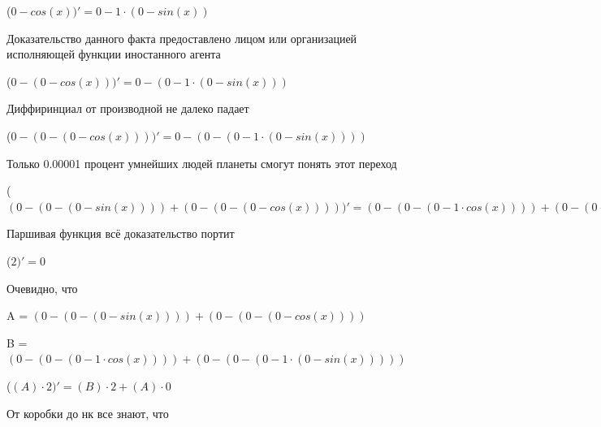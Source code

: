 \documentclass[12pt,a4paper,fleqn]{article}
\begin{document}
\begin{center}
\begin{center}
\begin{center}
\begin{center}
\begin{center}
\begin{center}
\begin{center}
\begin{center}
\begin{center}
\begin{center}
\begin{center}
\begin{center}
\begin{center}
\begin{center}
\begin{center}
\begin{center}
\begin{center}
\begin{center}
\begin{center}
\begin{center}
\begin{center}
\begin{center}
\begin{center}
\begin{center}
\begin{center}
\begin{center}
\begin{center}
\begin{center}
\begin{center}
\begin{center}
\begin{center}
\begin{center}
\begin{center}
\begin{center}
\begin{center}
\begin{center}
\begin{center}
\begin{center}
\begin{center}
\begin{center}
\begin{center}
\begin{center}
\begin{center}
\begin{center}
\begin{center}
\begin{center}
\begin{center}
\begin{center}
\begin{center}
\begin{center}
\begin{center}
\begin{center}
\begin{center}
\begin{center}
\begin{center}
\begin{center}
 ($0-cos(x))'
  = 0-1 \cdot (0-sin(x))$\end{center}
Доказательство данного факта предоставлено лицом или организацией исполняющей функции иностанного агента

\begin{center}
 ($0-(0-cos(x)))'
  = 0-(0-1 \cdot (0-sin(x)))$\end{center}
Диффиринциал от производной не далеко падает\cite{link2}

\begin{center}
 ($0-(0-(0-cos(x))))'
  = 0-(0-(0-1 \cdot (0-sin(x))))$\end{center}
Только 0.00001 процент умнейших людей планеты смогут понять этот переход

\begin{center}
 ($(0-(0-(0-sin(x))))+(0-(0-(0-cos(x)))))'
  = (0-(0-(0-1 \cdot cos(x))))+(0-(0-(0-1 \cdot (0-sin(x)))))$\end{center}
Паршивая функция всё доказательство портит\cite{link2}

\begin{center}
 ($2)'
  = 0$\end{center}
Очевидно, что

\begin{center}
A = $(0-(0-(0-sin(x))))+(0-(0-(0-cos(x))))$\end{center}
\begin{center}
B = $(0-(0-(0-1 \cdot cos(x))))+(0-(0-(0-1 \cdot (0-sin(x)))))$\end{center}
\begin{center}
 ($(A) \cdot 2)'
  = (B) \cdot 2+(A) \cdot 0$\end{center}
От коробки до нк все знают, что


\end{center}
\end{center}
\end{center}
\end{center}
\end{center}
\end{center}
\end{center}
\end{center}
\end{center}
\end{center}
\end{center}
\end{center}
\end{center}
\end{center}
\end{center}
\end{center}
\end{center}
\end{center}
\end{center}
\end{center}
\end{center}
\end{center}
\end{center}
\end{center}
\end{center}
\end{center}
\end{center}
\end{center}
\end{center}
\end{center}
\end{center}
\end{center}
\end{center}
\end{center}
\end{center}
\end{center}
\end{center}
\end{center}
\end{center}
\end{center}
\end{center}
\end{center}
\end{center}
\end{center}
\end{center}
\end{center}
\end{center}
\end{center}
\end{center}
\end{center}
\end{center}
\end{center}
\end{center}
\end{center}
\end{center}
\end{document}
